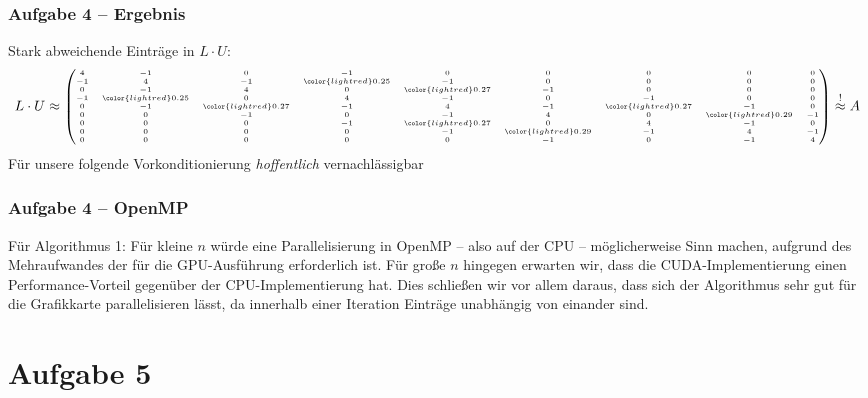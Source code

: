 \documentclass[german,notes,18pt]{beamer}
\begin{document}
	\begin{frame}
		\frametitle{Aufgabe 4 -- Ergebnis}
		Stark abweichende Einträge in $L\cdot U$:
		\begin{equation*}
		\tiny
		L\cdot U\approx \begin{pmatrix}
		4 & -1 &  0 & -1 &  0 & 0 &  0  & 0  & 0 \\
		-1  & 4 & -1 &  \color{lightred}0.25 & -1 &  0 &  0 &  0 &  0 \\
		0 & -1  & 4 &  0 &  \color{lightred}0.27 & -1  & 0  & 0  & 0 \\
		-1 &  \color{lightred}0.25 &  0 &  4 & -1 &  0 & -1 &  0 &  0 \\
		0 & -1 &  \color{lightred}0.27 & -1 &  4 & -1  & \color{lightred}0.27 & -1 &  0 \\
		0 &  0 & -1 &  0 & -1 &  4 &  0 & \color{lightred}0.29 & -1 \\
		0 &  0 &  0 & -1 &  \color{lightred}0.27 &  0 &  4 & -1 &  0 \\
		0 &  0 &  0 &  0 & -1 &  \color{lightred}0.29 & -1 &  4 & -1 \\
		0 &  0 &  0 &  0 &  0 & -1 &  0 & -1 &  4
		\end{pmatrix}
		\stackrel{!}{\approx}A
		\end{equation*}
		\vspace{2em}
		Für unsere folgende Vorkonditionierung \emph{hoffentlich} vernachlässigbar
	\end{frame}
	\begin{frame}
		\frametitle{Aufgabe 4 -- OpenMP}
		Für Algorithmus 1: Für kleine $n$ würde eine Parallelisierung in OpenMP -- also auf der CPU -- möglicherweise Sinn machen, aufgrund des Mehraufwandes der für die GPU-Ausführung erforderlich ist. Für große $n$ hingegen erwarten wir, dass die CUDA-Implementierung einen Performance-Vorteil gegenüber der CPU-Implementierung hat. Dies schließen wir vor allem daraus, dass sich der Algorithmus sehr gut für die Grafikkarte parallelisieren lässt, da innerhalb einer Iteration Einträge unabhängig von einander sind.
	\end{frame}


	\section{Aufgabe 5}
\end{document}
